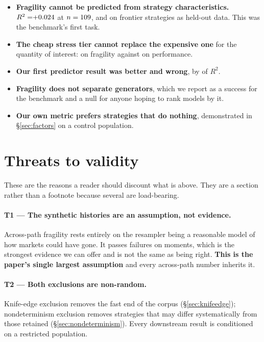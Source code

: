 \documentclass[11pt,a4paper]{article}
\begin{document}
\begin{itemize}
\item \textbf{Fragility cannot be predicted from strategy characteristics.} $R^2 =
  \rsPathsRawBestRsquared{}$ at $n=109{}$, and \rsGvPredPooledRsq{} on frontier
  strategies as held-out data. This was the benchmark's first task.
\item \textbf{The cheap stress tier cannot replace the expensive one} for the quantity of interest:
  \rsTierAgreementFragility{} on fragility against \rsTierAgreementMeanSharpe{} on performance.
\item \textbf{Our first predictor result was better and wrong}, by \rsLeakageDelta{} of $R^2$.
\item \textbf{Fragility does not separate generators}, which we report as a success for the
  benchmark and a null for anyone hoping to rank models by it.
\item \textbf{Our own metric prefers strategies that do nothing}, demonstrated in
  \S\ref{sec:factors} on a control population.
\end{itemize}

\section{Threats to validity}
\label{sec:threats}

These are the reasons a reader should discount what is above. They are a section rather than a
footnote because several are load-bearing.

\paragraph{T1 --- The synthetic histories are an assumption, not evidence.} Across-path fragility
rests entirely on the resampler being a reasonable model of how markets could have gone. It passes
\rsMomentsFailedConditional{} failures on \rsNMoments{} moments, which is the strongest evidence we
can offer and is not the same as being right. \textbf{This is the paper's single largest
assumption} and every across-path number inherits it.

\paragraph{T2 --- Both exclusions are non-random.} Knife-edge exclusion removes the fast end of the
corpus (\S\ref{sec:knifeedge}); nondeterminism exclusion removes strategies that may differ
systematically from those retained (\S\ref{sec:nondeterminism}). Every downstream result is
conditioned on a restricted population.
\end{document}
